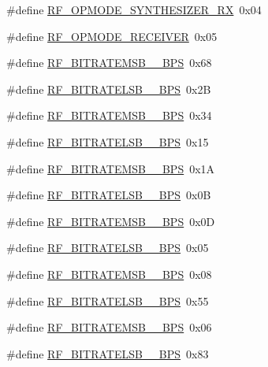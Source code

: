 \begin{DoxyCompactItemize}
\item 
\#define \hyperlink{sx1276Regs-Fsk_8h_a7257f5b516d9fe4c292a87c569ac1519}{R\+F\+\_\+\+O\+P\+M\+O\+D\+E\+\_\+\+S\+Y\+N\+T\+H\+E\+S\+I\+Z\+E\+R\+\_\+\+RX}~0x04
\item 
\#define \hyperlink{sx1276Regs-Fsk_8h_a7a13dffe3a61d783cdbbb0ac11cc85b2}{R\+F\+\_\+\+O\+P\+M\+O\+D\+E\+\_\+\+R\+E\+C\+E\+I\+V\+ER}~0x05
\item 
\#define \hyperlink{sx1276Regs-Fsk_8h_abefe1b1960c632cccac981eed31ddfdf}{R\+F\+\_\+\+B\+I\+T\+R\+A\+T\+E\+M\+S\+B\+\_\+\_\+\+B\+PS}~0x68
\item 
\#define \hyperlink{sx1276Regs-Fsk_8h_a61be3af220402958165d9e69f7f506c6}{R\+F\+\_\+\+B\+I\+T\+R\+A\+T\+E\+L\+S\+B\+\_\+\_\+\+B\+PS}~0x2B
\item 
\#define \hyperlink{sx1276Regs-Fsk_8h_af1a5b1f28fc382c9df4d6e482b448c3c}{R\+F\+\_\+\+B\+I\+T\+R\+A\+T\+E\+M\+S\+B\+\_\+\_\+\+B\+PS}~0x34
\item 
\#define \hyperlink{sx1276Regs-Fsk_8h_a9341847d10e8210454bc8c5abcbef3e3}{R\+F\+\_\+\+B\+I\+T\+R\+A\+T\+E\+L\+S\+B\+\_\+\_\+\+B\+PS}~0x15
\item 
\#define \hyperlink{sx1276Regs-Fsk_8h_a3fbe8a73f4b0a021159cd8046e9e1959}{R\+F\+\_\+\+B\+I\+T\+R\+A\+T\+E\+M\+S\+B\+\_\+\_\+\+B\+PS}~0x1A
\item 
\#define \hyperlink{sx1276Regs-Fsk_8h_a37dfb650a26879afa9a8aa036507b189}{R\+F\+\_\+\+B\+I\+T\+R\+A\+T\+E\+L\+S\+B\+\_\+\_\+\+B\+PS}~0x0B
\item 
\#define \hyperlink{sx1276Regs-Fsk_8h_ae69250b1621744d9da30c06f56d0f483}{R\+F\+\_\+\+B\+I\+T\+R\+A\+T\+E\+M\+S\+B\+\_\+\_\+\+B\+PS}~0x0D
\item 
\#define \hyperlink{sx1276Regs-Fsk_8h_ad137bc838a75f376cf1b9be4f53e6eb7}{R\+F\+\_\+\+B\+I\+T\+R\+A\+T\+E\+L\+S\+B\+\_\+\_\+\+B\+PS}~0x05
\item 
\#define \hyperlink{sx1276Regs-Fsk_8h_a1e8f56770ecc5d5f7264a7029f7ae2c3}{R\+F\+\_\+\+B\+I\+T\+R\+A\+T\+E\+M\+S\+B\+\_\+\_\+\+B\+PS}~0x08
\item 
\#define \hyperlink{sx1276Regs-Fsk_8h_a60340fe3a748b8e02ed6ebbf2426d620}{R\+F\+\_\+\+B\+I\+T\+R\+A\+T\+E\+L\+S\+B\+\_\+\_\+\+B\+PS}~0x55
\item 
\#define \hyperlink{sx1276Regs-Fsk_8h_aeec19a1a2418cf8ed29ac2ce61ebbe76}{R\+F\+\_\+\+B\+I\+T\+R\+A\+T\+E\+M\+S\+B\+\_\+\_\+\+B\+PS}~0x06
\item 
\#define \hyperlink{sx1276Regs-Fsk_8h_a4f1ddd00d5777887dc4b68b3711df3c9}{R\+F\+\_\+\+B\+I\+T\+R\+A\+T\+E\+L\+S\+B\+\_\+\_\+\+B\+PS}~0x83

\end{DoxyCompactItemize}
